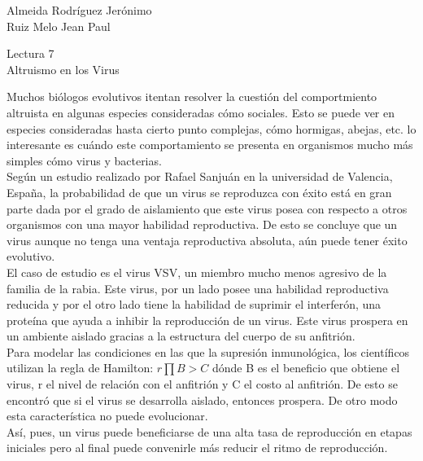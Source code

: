 \documentclass[a4paper, 12pt]{report}
\begin{document}
\begin{flushright}
    Almeida Rodríguez Jerónimo\\
    Ruiz Melo Jean Paul
\end{flushright}

\begin{center}
    {\LARGE Lectura 7}\\
    {\LARGE Altruismo en los Virus}
\end{center}

Muchos biólogos evolutivos itentan resolver la cuestión del comportmiento
altruista en algunas especies consideradas cómo sociales. Esto se puede ver en
especies consideradas hasta cierto punto complejas, cómo hormigas, abejas, etc.
lo interesante es cuándo este comportamiento se presenta en organismos mucho más
simples cómo virus y bacterias.\\

Según un estudio realizado por Rafael Sanjuán en la universidad de Valencia,
España, la probabilidad de que un virus se reproduzca con éxito está en gran
parte dada por el grado de aislamiento que este virus posea con respecto a otros
organismos con una mayor habilidad reproductiva. De esto se concluye que un
virus aunque no tenga una ventaja reproductiva absoluta, aún puede tener éxito
evolutivo.\\

El caso de estudio es el virus VSV, un miembro mucho menos agresivo de la
familia de la rabia. Este virus, por un lado posee una habilidad reproductiva
reducida y por el otro lado tiene la habilidad de suprimir el interferón, una
proteína que ayuda a inhibir la reproducción de un virus. Este virus prospera en
un ambiente aislado gracias a la estructura del cuerpo de su anfitrión.\\

Para modelar las condiciones en las que la supresión inmunológica, los
científicos utilizan la regla de Hamilton: $r\prod B > C$ dónde B es el
beneficio que obtiene el virus, r el nivel de relación con el anfitrión y C el
costo al anfitrión. De esto se encontró que si el virus se desarrolla aislado,
entonces prospera. De otro modo esta característica no puede evolucionar.\\

Así, pues, un virus puede beneficiarse de una alta tasa de reproducción en
etapas iniciales pero al final puede convenirle más reducir el ritmo de
reproducción.
\end{document}
